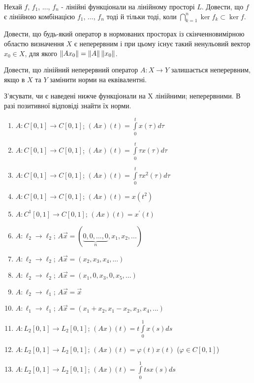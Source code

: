 \begin{exercise}
    Нехай $f$, $f_1$, ..., $f_n$ - лінійні функціонали на лінійному просторі $L$. 
    Довести, що $f$ є лінійною комбінацією $f_1$, ..., $f_n$ тоді й тільки тоді, 
    коли $\bigcap\limits_{k=1}^n \ker f_k \subset \ker f$.
\end{exercise}

\begin{exercise}
    Довести, що будь-який оператор в нормованих просторах із скінченновимірною областю 
    визначення $X$ є неперервним і при цьому існує такий ненульовий вектор $x_0 \in X$, 
    для якого $\left\lVert Ax_0\right\rVert = \left\lVert A\right\rVert\left\lVert x_0\right\rVert$.
\end{exercise}

\begin{exercise}
    Довести, що лінійний неперервний оператор $A: X \rightarrow Y$ залишається неперервним, 
    якщо в $X$ та $Y$ замінити норми на еквівалентні.
\end{exercise}

\begin{exercise}
    З'ясувати, чи є наведені нижче функціонали на X лінійними; 
    неперервними. В разі позитивної відповіді знайти їх норми.
    \begin{enumerate}[label=\ukr*)]
        \item $A: C[0, 1] \rightarrow C[0, 1]$; $(Ax)(t) = \int\limits_0^t x(\tau) d\tau$
        \item $A: C[0, 1] \rightarrow C[0, 1]$; $(Ax)(t) = \int\limits_0^t \tau x(\tau) d\tau$
        \item $A: C[0, 1] \rightarrow C[0, 1]$; $(Ax)(t) = \int\limits_0^t \tau x^2(\tau) d\tau$
        \item $A: C[0, 1] \rightarrow C[0, 1]$; $(Ax)(t) = x(t^2)$
        \item $A: C^1[0, 1] \rightarrow C[0, 1]$; $(Ax)(t) = x^\prime (t)$ 
        \item $A: \ell_2 \rightarrow \ell_2$; $A\vec{x} = (\underbrace{0,0,...,0}_n,
        x_1,x_2,...)$
        \item $A: \ell_2 \rightarrow \ell_2$; $A\vec{x} = (x_2,x_3,x_4,...)$
        \item $A: \ell_2 \rightarrow \ell_2$; $A\vec{x} = (x_1,0,x_3,0,x_5,...)$
        \item $A: \ell_2 \rightarrow \ell_1$; $A\vec{x} = \vec{x}$
        \item $A: \ell_1 \rightarrow \ell_1$; $A\vec{x} = (x_1+x_2, x_1-x_2, x_3, x_4, ...)$
        \item $A: L_2[0, 1] \rightarrow L_2[0, 1]$; $(Ax)(t) = t \int\limits_0^1 x(s)ds$
        \item $A: L_2[0, 1] \rightarrow L_2[0, 1]$; $(Ax)(t) = \varphi(t)x(t)$ 
        ($\varphi \in C[0,1]$)
        \item $A: L_2[0, 1] \rightarrow L_2[0, 1]$; $(Ax)(t) = \int\limits_0^1 tsx(s)ds$
    \end{enumerate}
\end{exercise}